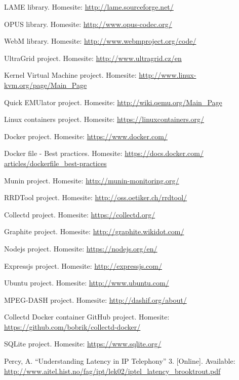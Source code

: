 \documentclass[english,final]{setup/eetac_tfc_pfc}
\begin{document}
\begin{thebibliography}{2}
LAME library. Homesite: \url{http://lame.sourceforge.net/}

OPUS library. Homesite: \url{http://www.opus-codec.org/}

WebM library. Homesite: \url{http://www.webmproject.org/code/}

UltraGrid project. Homesite: \url{http://www.ultragrid.cz/en}

Kernel Virtual Machine project. Homesite: \url{http://www.linux-kvm.org/page/Main_Page}

Quick EMUlator project. Homesite: \url{http://wiki.qemu.org/Main_Page}

Linux containers project. Homesite: \url{https://linuxcontainers.org/}

Docker project. Homesite: \url{https://www.docker.com/}

Docker file - Best practices. Homesite: \url{https://docs.docker.com/
articles/dockerfile_best-practices}

Munin project. Homesite: \url{http://munin-monitoring.org/}

RRDTool project. Homesite: \url{http://oss.oetiker.ch/rrdtool/}

Collectd project. Homesite: \url{https://collectd.org/}

Graphite project. Homesite: \url{http://graphite.wikidot.com/}

Nodejs project. Homesite: \url{https://nodejs.org/en/}

Expressjs project. Homesite: \url{http://expressjs.com/}

Ubuntu project. Homesite: \url{http://www.ubuntu.com/}

MPEG-DASH project. Homesite: \url{http://dashif.org/about/}

Collectd Docker container GitHub project. Homesite: \url{https://github.com/bobrik/collectd-docker/}

SQLite project. Homesite: \url{https://www.sqlite.org/}

Percy, A.
``Understanding Latency in IP Telephony'' 3. [Online]. Available:
\url{http://www.aitel.hist.no/fag/ipt/lek02/iptel_latency_brooktrout.pdf}

\end{thebibliography}
\pagestyle{empty}  %
\end{document}
